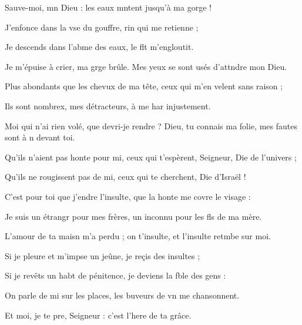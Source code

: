 \item Sauve-moi, mn Dieu :\psstar{} les eaux mntent jusqu’à ma gorge !
\item J’enfonce dans la vse du gouffre,\psstar{} rin qui me retienne ; 
\item Je descends dans l’abme des eaux,\psstar{} le flt m’engloutit.
\item Je m’épuise à crier, ma grge brûle.\psstar{} Mes yeux se sont usés d’attndre mon Dieu.
\item Plus abondants que les chevux de ma tête,\psstar{} ceux qui m’en velent sans raison ;
\item Ils sont nombrex, mes détracteurs,\psstar{} à me har injustement. 
\item Moi qui n’ai rien volé, que devri-je rendre ?\psstar{} Dieu, tu connais ma folie, mes fautes sont à n devant toi.
\item Qu’ils n’aient pas honte pour mi, ceux qui t’espèrent,\psstar{} Seigneur, Die de l’univers ;
\item Qu’ils ne rougissent pas de mi, ceux qui te cherchent,\psstar{} Die d’Israël !
\item C’est pour toi que j’endre l’insulte,\psstar{} que la honte me covre le visage :
\item Je suis un étrangr pour mes frères,\psstar{} un inconnu pour les fls de ma mère.
\item L’amour de ta maisn m’a perdu ;\psstar{} on t’insulte, et l’insulte retmbe sur moi.
\item Si je pleure et m’impse un jeûne,\psstar{} je reçis des insultes ;
\item Si je revêts un habt de pénitence,\psstar{} je deviens la fble des gens :
\item On parle de mi sur les places,\psstar{} les buveurs de vn me chansonnent.
\item Et moi, je te pre, Seigneur :\psstar{} c’est l’here de ta grâce.